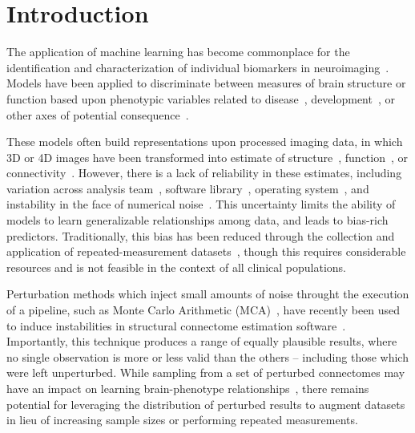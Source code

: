 \documentclass[10pt]{SelfArx} %
\affiliation{\textsuperscript{1}\textit{Montréal Neurological Institute, McGill University, Montréal, QC, Canada}}
\affiliation{\textsuperscript{2}\textit{Department of Computer Science and Software Engineering, Concordia University, Montréal, QC, Canada}}
\begin{document}
\flushbottom %
\maketitle %
\thispagestyle{empty} %

\pagestyle{fancy}
\section*{Introduction}

The application of machine learning has become commonplace for the identification and characterization of individual
biomarkers in neuroimaging~\cite{woo2017building}. Models have been applied to discriminate between measures of brain
structure or function based upon phenotypic variables related to
disease~\cite{Crossley2014-tg,Payabvash2019-tm,Tolan2018-nq}, development~\cite{Zhang2019-ko}, or other axes of
potential consequence~\cite{Zhu2018-cs,Park2015-uj}.

These models often build representations upon processed imaging data, in which 3D or 4D images have been transformed
into estimate of structure~\cite{wade2017machine}, function~\cite{weis2020sex}, or
connectivity~\cite{munsell2015evaluation}. However, there is a lack of reliability in these estimates, including
variation across analysis team~\cite{botvinik2020variability}, software library~\cite{bowring2019exploring}, operating
system~\cite{salari2020file}, and instability in the face of numerical noise~\cite{Kiar2020-kz}. This uncertainty
limits the ability of models to learn generalizable relationships among data, and leads to bias-rich predictors.
Traditionally, this bias has been reduced through the collection and application of repeated-measurement
datasets~\cite{sudlow2015uk,zuo2014open}, though this requires considerable resources and is not feasible in the
context of all clinical populations.

Perturbation methods which inject small amounts of noise throught the execution of a pipeline, such as Monte Carlo
Arithmetic (MCA)~\cite{Parker1997-qq,Denis2016-wo}, have recently been used to induce instabilities in structural
connectome estimation software~\cite{Kiar2020-lb}. Importantly, this technique produces a range of equally plausible
results, where no single observation is more or less valid than the others – including those which were left
unperturbed. While sampling from a set of perturbed connectomes may have an impact on learning brain-phenotype
relationships~\cite{Kiar2020-kz}, there remains potential for leveraging the distribution of perturbed results to
augment datasets in lieu of increasing sample sizes or performing repeated measurements.
\end{document}

